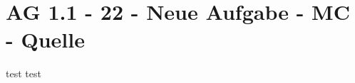 \section{AG 1.1 - 22 - Neue Aufgabe - MC - Quelle}

\begin{beispiel}[AG 1.1]{1}
test test
\end{beispiel}